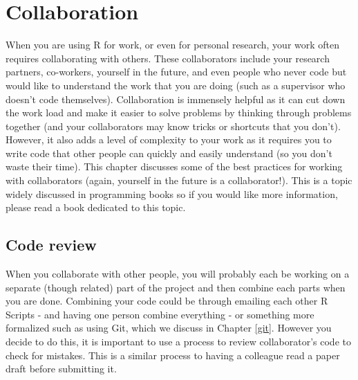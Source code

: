 \documentclass[
  12pt,
  openany]{book}
\begin{document}
\hypertarget{collaboration}{%
\chapter{Collaboration}\label{collaboration}}

When you are using R for work, or even for personal research, your work often requires collaborating with others. These collaborators include your research partners, co-workers, yourself in the future, and even people who never code but would like to understand the work that you are doing (such as a supervisor who doesn't code themselves). Collaboration is immensely helpful as it can cut down the work load and make it easier to solve problems by thinking through problems together (and your collaborators may know tricks or shortcuts that you don't). However, it also adds a level of complexity to your work as it requires you to write code that other people can quickly and easily understand (so you don't waste their time). This chapter discusses some of the best practices for working with collaborators (again, yourself in the future is a collaborator!). This is a topic widely discussed in programming books so if you would like more information, please read a book dedicated to this topic.

\hypertarget{code-review}{%
\section{Code review}\label{code-review}}

When you collaborate with other people, you will probably each be working on a separate (though related) part of the project and then combine each parts when you are done. Combining your code could be through emailing each other R Scripts - and having one person combine everything - or something more formalized such as using Git, which we discuss in Chapter \ref{git}. However you decide to do this, it is important to use a process to review collaborator's code to check for mistakes. This is a similar process to having a colleague read a paper draft before submitting it.
\end{document}
